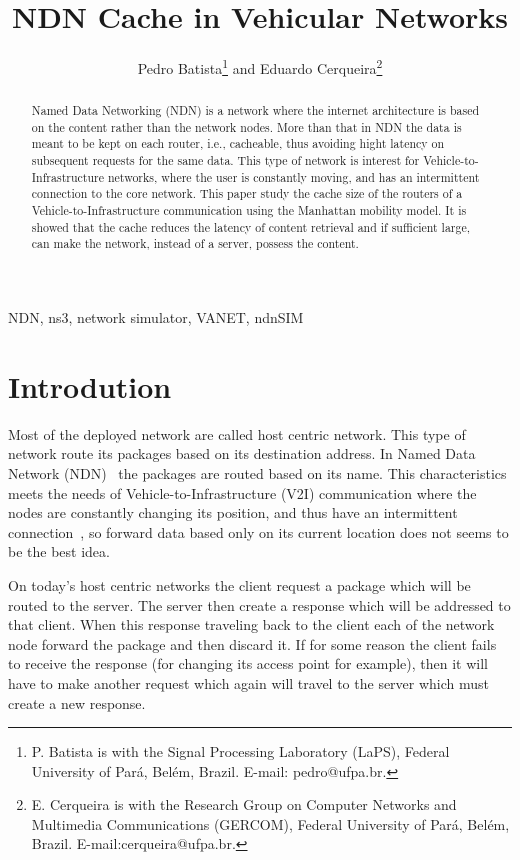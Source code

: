 \documentclass[10pt,a4paper,final]{IEEEtran}
\begin{document}
\title{NDN Cache in Vehicular Networks}

\author{Pedro Batista\thanks{P. Batista is with the Signal Processing
    Laboratory (LaPS), Federal University of Pará, Belém, Brazil. E-mail:
    pedro@ufpa.br.} and
Eduardo Cerqueira\thanks{E. Cerqueira is with the Research Group on Computer
    Networks and Multimedia Communications (GERCOM), Federal University of
    Pará, Belém, Brazil.  E-mail:cerqueira@ufpa.br.}}
\maketitle

\begin{abstract}
Named Data Networking (NDN) is a network where the internet architecture
is based on the content rather than the network nodes. More than that
in NDN the data is meant to be kept on each router, i.e., cacheable, thus
avoiding hight latency on subsequent requests for the same data. This type of
network is interest for Vehicle-to-Infrastructure networks, where the user is
constantly moving, and has an intermittent connection to the core network.
This paper study the cache size of the routers of a Vehicle-to-Infrastructure
communication using the Manhattan mobility model. It is showed that the cache
reduces the latency of content retrieval and if sufficient large, can make the
network, instead of a server, possess the content.
\end{abstract}

\begin{IEEEkeywords}
NDN, ns3, network simulator, VANET, ndnSIM
\end{IEEEkeywords}

\section{Introdution}

Most of the deployed network are called host centric network. This type of
network route its packages based on its destination
address. In Named Data Network (NDN)~\cite{zhang2010named}
the packages are routed based on its
name. This characteristics meets the needs of Vehicle-to-Infrastructure (V2I)
communication where the nodes are constantly changing its position, and thus
have an intermittent connection~\cite{rowstron2009characteristics}, so forward
data based only on its current location does not seems to be the best idea.

On today's host centric networks the client request a package which will be
routed to the server. The server then create a response which will be
addressed to that client. When this response traveling back to the client each of
the network node forward the package and then discard it. If for some reason
the client fails to receive the response (for changing its access point for
example), then it will have to make another request which again will travel to
the server which must create a new response.
\end{document}
